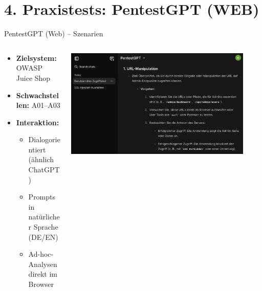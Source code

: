 \documentclass[
	aspectratio=169,	%
	onlytextwidth,		%
	t,					%
	]{beamer}
\begin{document}
\section{4. Praxistests: PentestGPT (WEB)}
\begin{frame}{PentestGPT (Web) – Szenarien}
	\begin{columns}
		\begin{column}[T]{.4\textwidth}
			\begin{itemize}
				\item \textbf{Zielsystem:} OWASP Juice Shop
				\item \textbf{Schwachstellen:} A01–A03 
				\item \textbf{Interaktion:}
				\begin{itemize}
					\item Dialogorientiert (ähnlich ChatGPT)
					\item Prompts in natürlicher Sprache (DE/EN)
					\item Ad-hoc-Analysen direkt im Browser
				\end{itemize}
			\end{itemize}
		\end{column}
		\begin{column}[T]{.6\textwidth}
			\centering
			\includegraphics[width=0.9\textwidth]{figures/22.png}
			\label{fig:22}
		\end{column}
	\end{columns}
\end{frame}
\end{document}
